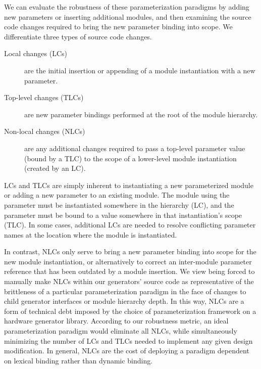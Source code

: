 We can evaluate the robustness of these parameterization paradigms by adding new parameters or inserting additional modules, and then examining the source code changes required to bring the new parameter binding into scope. 
We differentiate three types of source code changes.

\begin{description}
\item[Local changes (LCs)] are the initial insertion or appending of a module instantiation with a new parameter. 
\item[Top-level changes (TLCs)] are new parameter bindings performed at the root of the module hierarchy. 
\item[Non-local changes (NLCs)] are any additional changes required to pass a top-level parameter value (bound by a TLC) to the scope of a lower-level module instantiation (created by an LC). 
\end{description}

LCs and TLCs are simply inherent to instantiating a new parameterized module or adding a new parameter to an existing module.
The module using the parameter must be instantiated somewhere in the hierarchy (LC), and the parameter must be bound to a value
somewhere in that instantiation's scope (TLC).
In some cases, additional LCs are needed to resolve conflicting parameter names at the location where the module is instantiated.

In contrast, NLCs only serve to bring a new parameter binding into scope for the new module instantiation,
or alternatively to correct an inter-module parameter reference that has been outdated by a module insertion.
We view being forced to manually make NLCs within our generators' source code as representative of
the brittleness of a particular parameterization paradigm in the face of changes to child generator interfaces
or module hierarchy depth.
In this way, NLCs are a form of technical debt imposed by the choice of parameterization framework on a hardware generator library.
According to our robustness metric, an ideal parameterization paradigm would eliminate all NLCs,
while simultaneously minimizing the number of LCs and TLCs needed to implement any given design modification.
In general, NLCs are the cost of deploying a paradigm dependent on lexical binding rather than dynamic binding.


